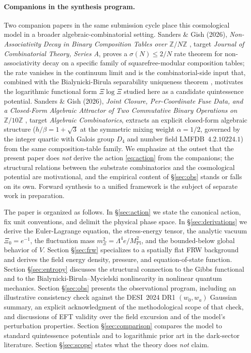 \documentclass[11pt,reqno]{amsart}
\theoremstyle{plain}
\theoremstyle{definition}
\theoremstyle{remark}
\newcommand{\Pl}{\mathrm{Pl}}
\begin{document}
\paragraph{Companions in the synthesis program.}
Two companion papers in the same submission cycle place this
cosmological model in a broader algebraic-combinatorial setting.
Sanders \& Gish (2026), \emph{Non-Associativity Decay in Binary
Composition Tables over $\mathbb{Z}/N\mathbb{Z}$}
\cite{SandersGishSigma2026}, target \emph{Journal of Combinatorial
Theory, Series A}, proves a $\sigma(N) \leq 2/N$ rate theorem for
non-associativity decay on a specific family of squarefree-modular
composition tables; the rate vanishes in the continuum limit and is the
combinatorial-side input that, combined with the Bialynicki-Birula
separability uniqueness theorem
\cite{BialynickiBirulaMycielski1976}, motivates the logarithmic
functional form $\Xi\log\Xi$ studied here as a candidate quintessence
potential. Sanders \& Gish (2026), \emph{Joint Closure,
Per-Coordinate Fuse Data, and a Closed-Form Algebraic Attractor of Two
Commutative Binary Operations on $\mathbb{Z}/10\mathbb{Z}$}
\cite{SandersGishFourCore2026}, target \emph{Algebraic Combinatorics},
extracts an explicit closed-form algebraic structure
($h/\beta = 1+\sqrt{3}$ at the symmetric mixing weight $\alpha = 1/2$,
governed by the integer quartic with Galois group $D_4$ and number
field LMFDB~$4.2.10224.1$) from the same composition-table family. We
emphasize at the outset that the present paper does \emph{not} derive
the action \eqref{eq:action} from the companions; the structural
relations between the substrate combinatorics and the cosmological
potential are motivational, and the empirical content of
\S\ref{sec:obs} stands or falls on its own. Forward synthesis to a
unified framework is the subject of separate work in preparation.

The paper is organized as follows. In \S\ref{sec:action} we state the
canonical action, fix unit conventions, and delimit the physical phase space.
In \S\ref{sec:derivations} we derive the Euler-Lagrange equation, the
stress-energy tensor, the analytic vacuum $\Xi_0 = e^{-1}$, the fluctuation
mass $m_\Xi^{2} = \Lambda^{4} e / M_\Pl^{2}$, and the bounded-below
global behavior of $V$.
Section \S\ref{sec:frw} specializes to a spatially flat FRW background and
derives the field energy density, pressure, and equation-of-state function.
Section \S\ref{sec:entropy} discusses the structural connection to the
Gibbs functional and to the Bialynicki-Birula--Mycielski nonlinearity in
nonlinear quantum mechanics. Section \S\ref{sec:obs} presents the
observational program, including an illustrative consistency check against
the DESI~2024 DR1 $(w_0, w_a)$ Gaussian summary, an explicit acknowledgment
of the methodological scope of that check, and discussions of EFT validity
over the field excursion and of the model's perturbation properties.
Section \S\ref{sec:comparison} compares the model to standard quintessence
potentials and to logarithmic prior art in the dark-sector literature.
Section \S\ref{sec:scope} states what the theory does \emph{not} claim.
\end{document}
